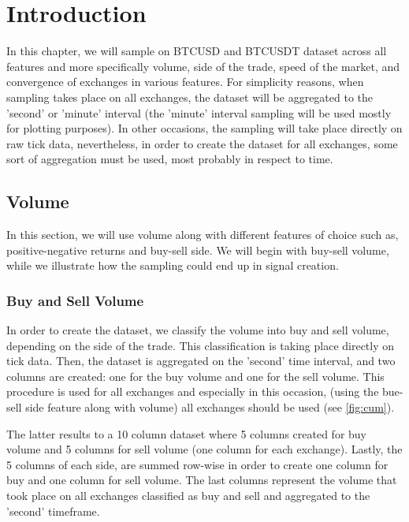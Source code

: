 
\section{Introduction}

In this chapter, we will sample on BTCUSD and BTCUSDT dataset across all features and more specifically volume, side of the trade, speed of the market, and convergence of exchanges in various features. For simplicity reasons, when sampling takes place on all exchanges, the dataset will be aggregated to the 'second' or 'minute' interval (the 'minute' interval sampling will be used mostly for plotting purposes). In other occasions, the sampling will take place directly on raw tick data, nevertheless, in order to create the dataset for all exchanges, some sort of aggregation must be used, most probably in respect to time.

\subsection{Volume}

In this section, we will use volume along with different features of choice such as, positive-negative returns and buy-sell side. We will begin with buy-sell volume, while we illustrate how the sampling could end up in signal creation.

\subsubsection{Buy and Sell Volume}

In order to create the dataset, we classify the volume into buy and sell volume, depending on the side of the trade. This classification is taking place directly on tick data. Then, the dataset is aggregated on the 'second' time interval, and two columns are created: one for the buy volume and one for the sell volume. This procedure is used for all exchanges and especially in this occasion, (using the bue-sell side feature along with volume) all exchanges should be used (see \ref{fig:cum}). 

The latter results to a 10 column dataset where 5 columns created for buy volume and 5 columns for sell volume (one column for each exchange). Lastly, the 5 columns of each side, are summed row-wise in order to create one column for buy and one column for sell volume. The last columns represent the volume that took place on all exchanges classified as buy and sell and aggregated to the 'second' timeframe.

